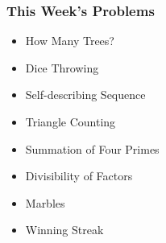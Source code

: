 \begin{frame}
  \frametitle{This Week's Problems}
  \begin{itemize}
  \item How Many Trees?
  \item Dice Throwing 
  \item Self-describing Sequence 	
  \item	Triangle Counting  	
  \item	Summation of Four Primes 	
  \item	Divisibility of Factors
  \item Marbles
  \item Winning Streak
  \end{itemize}
\end{frame}
